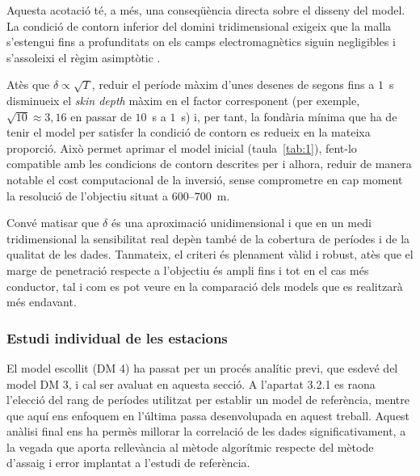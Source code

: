 \documentclass[11pt,a4paper,oneside]{article}
\begin{document}
\vspace{5pt}

 
Aquesta acotació té, a més, una conseqüència directa sobre el disseny del model. La
condició de contorn inferior del domini tridimensional exigeix que la malla
s'estengui fins a profunditats on els camps electromagnètics siguin negligibles
i s'assoleixi el règim asimptòtic \citep{chavejones2012,egbert2014}.

\vspace{5pt}
Atès que $\delta \propto \sqrt{T}$, reduir el període màxim d'unes desenes
de segons fins a $1$~s disminueix el \emph{skin depth} màxim en el factor
corresponent (per exemple, $\sqrt{10} \approx 3{,}16$ en passar de $10$~s a $1$~s) i,
per tant, la fondària mínima que ha de tenir el model per satisfer la condició de
contorn es redueix en la mateixa proporció. Això permet aprimar el model inicial (taula~\ref{tab:1}), fent-lo compatible amb les condicions de contorn descrites per \citet{chavejones2012}
i alhora, reduir de manera notable el cost computacional de la inversió, sense
comprometre en cap moment la resolució de l'objectiu situat a $600\text{–}700$~m.

\vspace{5pt}
 
Convé matisar que $\delta$  és una aproximació
unidimensional i que en un medi tridimensional la sensibilitat real depèn també de la
cobertura de períodes i de la qualitat de les dades. Tanmateix, el
criteri és plenament vàlid i robust, atès que el marge de penetració respecte a
l'objectiu és ampli fins i tot en el cas més conductor, tal i com es pot veure en la comparació dels models que es realitzarà més endavant.

\subsubsection{Estudi individual de les estacions}

El model escollit (DM 4) ha passat per un procés analític previ, que esdevé del model DM 3, i cal ser avaluat en aquesta secció. A l'apartat 3.2.1 es raona l'elecció del rang de períodes utilitzat per establir un model de referència, mentre que aquí ens enfoquem en l'última passa desenvolupada en aquest treball. Aquest anàlisi final ens ha permès millorar la correlació de les dades significativament, a la vegada que aporta rellevància al mètode algorítmic respecte del mètode d'assaig i error implantat a l'estudi de referència. 

\vspace{5pt}
\end{document}
